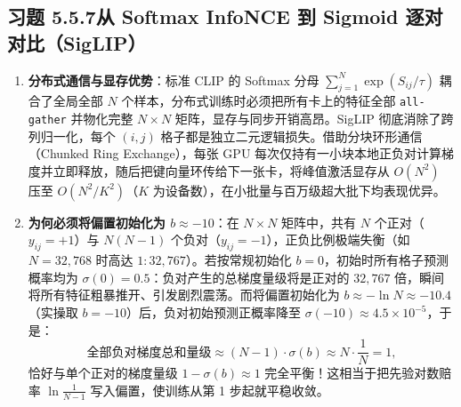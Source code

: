 \subsection*{习题 5.5.7\quad 从 Softmax InfoNCE 到 Sigmoid 逐对对比（SigLIP）}
\begin{enumerate}[label=(\arabic*), leftmargin=1.8em]
  \item \textbf{分布式通信与显存优势}：标准 CLIP 的 Softmax 分母 $\sum_{j=1}^N \exp(S_{ij}/\tau)$ 耦合了全局全部 $N$ 个样本，分布式训练时必须把所有卡上的特征全部 \texttt{all-gather} 并物化完整 $N\times N$ 矩阵，显存与同步开销高昂。SigLIP 彻底消除了跨列归一化，每个 $(i, j)$ 格子都是独立二元逻辑损失。借助分块环形通信（Chunked Ring Exchange），每张 GPU 每次仅持有一小块本地正负对计算梯度并立即释放，随后把键向量环传给下一张卡，将峰值激活显存从 $O(N^2)$ 压至 $O(N^2 / K^2)$（$K$ 为设备数），在小批量与百万级超大批下均表现优异。
  \item \textbf{为何必须将偏置初始化为 $b \approx -10$}：在 $N \times N$ 矩阵中，共有 $N$ 个正对（$y_{ij}=+1$）与 $N(N-1)$ 个负对（$y_{ij}=-1$），正负比例极端失衡（如 $N = 32{,}768$ 时高达 $1 : 32{,}767$）。若按常规初始化 $b = 0$，初始时所有格子预测概率均为 $\sigma(0) = 0.5$：负对产生的总梯度量级将是正对的 $32{,}767$ 倍，瞬间将所有特征粗暴推开、引发剧烈震荡。而将偏置初始化为 $b \approx -\ln N \approx -10.4$（实操取 $b = -10$）后，负对初始预测正概率降至 $\sigma(-10) \approx 4.5 \times 10^{-5}$，于是：
  \[
    \text{全部负对梯度总和量级} \approx (N - 1)\cdot \sigma(b) \approx N \cdot \frac{1}{N} = 1,
  \]
  恰好与单个正对的梯度量级 $1 - \sigma(b) \approx 1$ 完全平衡！这相当于把先验对数赔率 $\ln\frac{1}{N-1}$ 写入偏置，使训练从第 1 步起就平稳收敛。
\end{enumerate}

